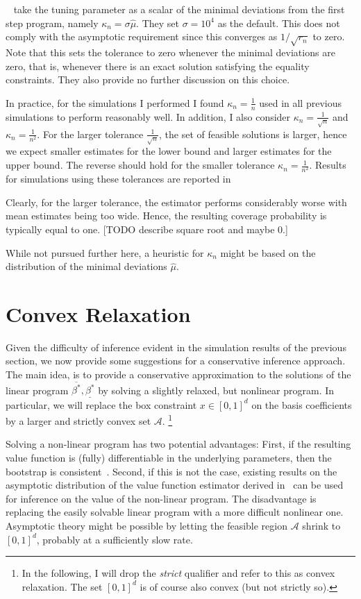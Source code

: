 \documentclass[12pt,a4paper,english]{article} %
\numberwithin{equation}{section}
\theoremstyle{definition}
\theoremstyle{remark}
\theoremstyle{plain}
\begin{document}
~\cite{shea2023ivmte} take the tuning parameter as a scalar of the minimal deviations from the first step program, namely $\kappa_n = \sigma \hat{\mu}$. They set $\sigma = 10^4$ as the default.
This does not comply with the asymptotic requirement since this converges as $1/\sqrt{r_n}$ to zero.
Note that this sets the tolerance to zero whenever the minimal deviations are zero, that is, whenever there is an exact solution satisfying the equality constraints.
They also provide no further discussion on this choice.

In practice, for the simulations I performed I found $\kappa_n = \frac{1}{n}$ used in all previous simulations to perform reasonably well.
In addition, I also consider $\kappa_n = \frac{1}{\sqrt{n}}$ and $\kappa_n = \frac{1}{n^2}$.
For the larger tolerance $\frac{1}{\sqrt{n}}$, the set of feasible solutions is larger, hence we expect smaller estimates for the lower bound and larger estimates for the upper bound.
The reverse should hold for the smaller tolerance $\kappa_n = \frac{1}{n^2}$.
Results for simulations using these tolerances are reported in %

Clearly, for the larger tolerance, the estimator performs considerably worse with mean estimates being too wide.
Hence, the resulting coverage probability is typically equal to one.
[TODO describe square root and maybe 0.]

While not pursued further here, a heuristic for $\kappa_n$ might be based on the distribution of the minimal deviations $\hat{\mu}$.

\section{Convex Relaxation}
Given the difficulty of inference evident in the simulation results of the previous section, we now provide some suggestions for a conservative inference approach.
The main idea, is to provide a conservative approximation to the solutions of the linear program $\overline{\beta^*}, \underline{\beta^*}$ by solving a slightly relaxed, but nonlinear program.
In particular, we will replace the box constraint $x\in[0,1]^d$ on the basis coefficients by a larger and strictly convex set $\mathcal{A}$.
\footnote{In the following, I will drop the \textit{strict} qualifier and refer to this as convex relaxation. The set $[0,1]^d$ is of course also convex (but not strictly so).}

Solving a non-linear program has two potential advantages:
First, if the resulting value function is (fully) differentiable in the underlying parameters, then the bootstrap is consistent~\citep{fang2019infdirdiff}.
Second, if this is not the case, existing results on the asymptotic distribution of the value function estimator derived in~\cite{shapiro1991asymptotic} can be used for inference on the value of the non-linear program.
The disadvantage is replacing the easily solvable linear program with a more difficult nonlinear one.
Asymptotic theory might be possible by letting the feasible region $\mathcal{A}$ shrink to $[0,1]^d$, probably at a sufficiently slow rate.
\end{document}
